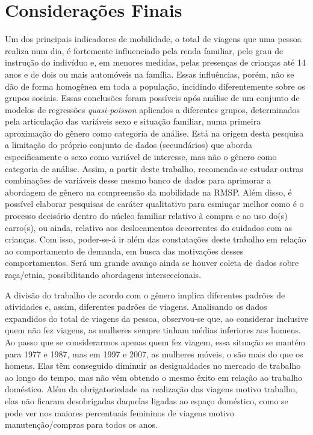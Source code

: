 \chapter{Considerações Finais}\label{chap:considfinais}


Um dos principais indicadores de mobilidade, o total de viagens que uma pessoa realiza num dia, é fortemente influenciado pela renda familiar, pelo grau de instrução do indivíduo e, em menores medidas, pelas presenças de crianças até 14 anos e de dois ou mais automóveis na família.
Essas influências, porém, não se dão de forma homogênea em toda a população, incidindo diferentemente sobre os grupos sociais.
Essas conclusões foram possíveis após análise de um conjunto de modelos de regressões \textit{quasi-poisson} aplicados a diferentes grupos, determinados pela articulação das variáveis sexo e situação familiar, numa primeira aproximação do gênero como categoria de análise.
Está na origem desta pesquisa a limitação do próprio conjunto de dados (secundários) que aborda especificamente o sexo como variável de interesse, mas não o gênero como categoria de análise.
Assim, a partir deste trabalho, recomenda-se estudar outras combinações de variáveis desse mesmo banco de dados para aprimorar a abordagem de gênero na compreensão da mobilidade na RMSP.
Além disso, é possível elaborar pesquisas de caráter qualitativo para esmiuçar melhor como é o processo decisório dentro do núcleo familiar relativo à compra e ao uso do(s) carro(s), ou ainda, relativo aos deslocamentos decorrentes do cuidados com as crianças. Com isso, poder-se-á ir além das constatações deste trabalho em relação ao comportamento de demanda, em busca das motivações desses comportamentos. Será um grande avanço ainda se houver coleta de dados sobre raça/etnia, possibilitando abordagens interseccionais.

A divisão do trabalho de acordo com o gênero implica diferentes padrões de atividades e, assim, diferentes padrões de viagens. 
Analisando os dados expandidos do total de viagens da pessoa, observou-se que, ao considerar inclusive quem não fez viagens, as mulheres sempre tinham médias inferiores aos homens. Ao passo que se considerarmos apenas quem fez viagem, essa situação se mantém para 1977 e 1987, mas em 1997 e 2007, as mulheres móveis, o são mais do que os homens. 
Elas têm conseguido diminuir as desigualdades no mercado de trabalho ao longo do tempo, mas não vêm obtendo o mesmo êxito em relação ao trabalho doméstico. 
Além da obrigatoriedade na realização das viagens motivo trabalho, elas não ficaram desobrigadas daquelas ligadas ao espaço doméstico, como se pode ver nos maiores percentuais femininos de viagens motivo manutenção/compras para todos os anos.

